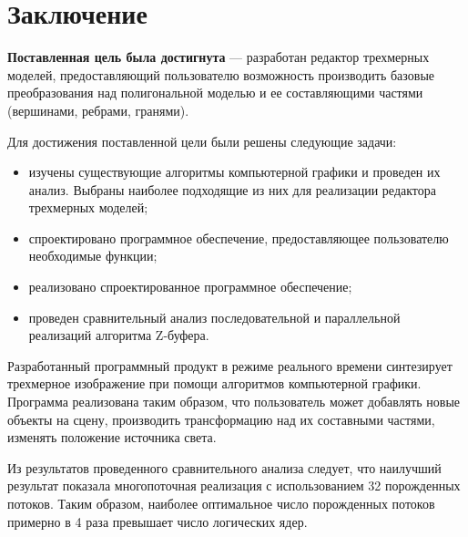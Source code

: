 \chapter*{Заключение}

\textbf{Поставленная цель была достигнута} --- разработан редактор трехмерных моделей, предоставляющий пользователю возможность производить базовые преобразования над полигональной моделью и ее составляющими частями (вершинами, ребрами, гранями).

Для достижения поставленной цели были решены следующие задачи:
\begin{itemize}[label=---]
	\item изучены существующие алгоритмы компьютерной графики и проведен их анализ. Выбраны наиболее подходящие из них для реализации редактора трехмерных моделей;
	\item спроектировано программное обеспечение, предоставляющее пользователю необходимые функции;
	\item реализовано спроектированное программное обеспечение;
	\item проведен сравнительный анализ последовательной и параллельной реализаций алгоритма Z-буфера.
\end{itemize}

Разработанный программный продукт в режиме реального времени синтезирует трехмерное изображение при помощи алгоритмов компьютерной графики. Программа реализована таким образом, что пользователь может добавлять новые объекты на сцену, производить трансформацию над их составными частями, изменять положение источника света. 

Из результатов проведенного сравнительного анализа следует, что наилучший результат показала многопоточная реализация с использованием 32 порожденных потоков. Таким образом, наиболее оптимальное число порожденных потоков примерно в 4 раза превышает число логических ядер.

